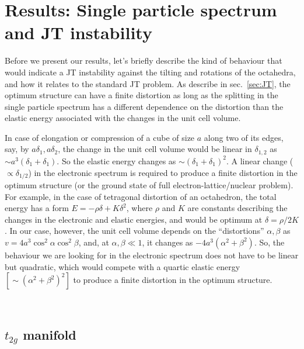 \documentclass[a4paper,prb]{revtex4-1}  %
\newcommand{\az}[1]{{\color{magenta}{#1}}} %
\begin{document}
\section{Results: Single particle spectrum and JT instability}
 
Before we present our results,
let's briefly describe 
the kind of behaviour that would indicate a JT instability 
against the tilting and rotations of the octahedra,
and how it relates to the standard JT problem.
As describe in sec.~\ref{sec:JT},
the optimum structure can have a finite distortion
as long as 
the splitting in the single particle spectrum has a different dependence on the distortion
than the elastic energy associated with the changes in the unit cell volume.

In case of \az{names? Tetragonal distortion, or quadrupolar distortion, }
elongation or compression of a cube of size $a$ along two of its edges, say, by $a\delta_1,a\delta_2$,
the change in the unit cell volume would be linear in $\delta_{1,2}$
as $\sim a^3\left(\delta_1+\delta_1\right)$.
So the elastic energy %
changes as $\sim\left(\delta_1+\delta_1\right)^2$.
A linear change ($\propto \delta_{1/2}$) in the electronic spectrum is required to produce
 a finite distortion in the optimum structure (or the ground state of full electron-lattice/nuclear problem).
For example, in the case of tetragonal distortion of an octahedron,
 the total energy has a form
$E=-\rho\delta + K \delta^2$, where $\rho$ and $K$ are constants 
describing the changes in the electronic and elastic energies,
and would be optimum at $\delta=\rho/2K$.
In our case, however,
the unit cell volume depends on the ``distortions'' $\alpha,\beta$ as ${v=4a^3 \cos ^2\alpha \cos ^2\beta}$,
and, at $\alpha,\beta\ll1$,
it changes as $-4a^3\left(\alpha ^2+\beta ^2\right)$.
So, the behaviour we are looking for in the electronic spectrum does not have to be linear 
but quadratic, which would compete with a quartic elastic energy $\left[ \sim\left(\alpha ^2+\beta ^2\right)^2 \right]$
 to produce a finite distortion in the optimum structure.



\az{Focus on t2g first:}\\

\subsection{$t_{2g}$ manifold} %
\end{document}
